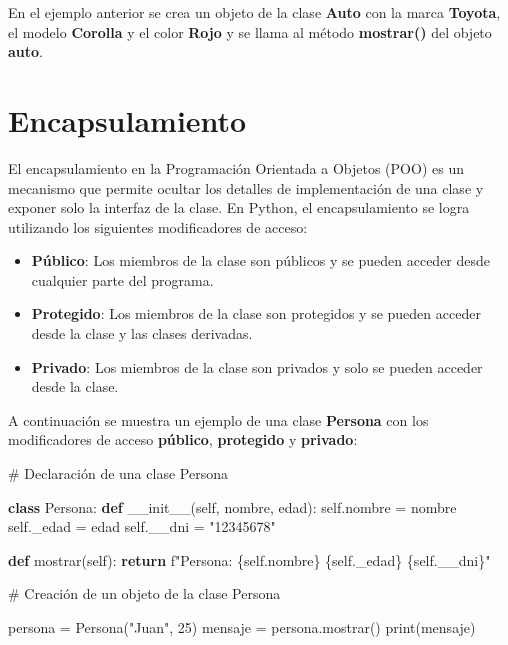 \documentclass[
  a4paper,
  DIV=11,
  numbers=noendperiod,
  onepage,
  openany]{scrreprt}
\newenvironment{Shaded}{\begin{snugshade}}{\end{snugshade}}
\newcommand{\BuiltInTok}[1]{\textcolor[rgb]{0.00,0.23,0.31}{#1}}
\newcommand{\CommentTok}[1]{\textcolor[rgb]{0.37,0.37,0.37}{#1}}
\newcommand{\ControlFlowTok}[1]{\textcolor[rgb]{0.00,0.23,0.31}{\textbf{#1}}}
\newcommand{\DecValTok}[1]{\textcolor[rgb]{0.68,0.00,0.00}{#1}}
\newcommand{\FunctionTok}[1]{\textcolor[rgb]{0.28,0.35,0.67}{#1}}
\newcommand{\KeywordTok}[1]{\textcolor[rgb]{0.00,0.23,0.31}{\textbf{#1}}}
\newcommand{\NormalTok}[1]{\textcolor[rgb]{0.00,0.23,0.31}{#1}}
\newcommand{\OperatorTok}[1]{\textcolor[rgb]{0.37,0.37,0.37}{#1}}
\newcommand{\SpecialCharTok}[1]{\textcolor[rgb]{0.37,0.37,0.37}{#1}}
\newcommand{\SpecialStringTok}[1]{\textcolor[rgb]{0.13,0.47,0.30}{#1}}
\newcommand{\StringTok}[1]{\textcolor[rgb]{0.13,0.47,0.30}{#1}}
\newcommand{\VariableTok}[1]{\textcolor[rgb]{0.07,0.07,0.07}{#1}}
\begin{document}
En el ejemplo anterior se crea un objeto de la clase \textbf{Auto} con
la marca \textbf{Toyota}, el modelo \textbf{Corolla} y el color
\textbf{Rojo} y se llama al método \textbf{mostrar()} del objeto
\textbf{auto}.

\section{Encapsulamiento}\label{encapsulamiento}

El encapsulamiento en la Programación Orientada a Objetos (POO) es un
mecanismo que permite ocultar los detalles de implementación de una
clase y exponer solo la interfaz de la clase. En Python, el
encapsulamiento se logra utilizando los siguientes modificadores de
acceso:

\begin{itemize}
\item
  \textbf{Público}: Los miembros de la clase son públicos y se pueden
  acceder desde cualquier parte del programa.
\item
  \textbf{Protegido}: Los miembros de la clase son protegidos y se
  pueden acceder desde la clase y las clases derivadas.
\item
  \textbf{Privado}: Los miembros de la clase son privados y solo se
  pueden acceder desde la clase.
\end{itemize}

A continuación se muestra un ejemplo de una clase \textbf{Persona} con
los modificadores de acceso \textbf{público}, \textbf{protegido} y
\textbf{privado}:

\begin{Shaded}
\begin{Highlighting}[]
\CommentTok{\# Declaración de una clase Persona}

\KeywordTok{class}\NormalTok{ Persona:}
    \KeywordTok{def} \FunctionTok{\_\_init\_\_}\NormalTok{(}\VariableTok{self}\NormalTok{, nombre, edad):}
        \VariableTok{self}\NormalTok{.nombre }\OperatorTok{=}\NormalTok{ nombre}
        \VariableTok{self}\NormalTok{.\_edad }\OperatorTok{=}\NormalTok{ edad}
        \VariableTok{self}\NormalTok{.\_\_dni }\OperatorTok{=} \StringTok{"12345678"}

    \KeywordTok{def}\NormalTok{ mostrar(}\VariableTok{self}\NormalTok{):}
        \ControlFlowTok{return} \SpecialStringTok{f"Persona: }\SpecialCharTok{\{}\VariableTok{self}\SpecialCharTok{.}\NormalTok{nombre}\SpecialCharTok{\}}\SpecialStringTok{ }\SpecialCharTok{\{}\VariableTok{self}\SpecialCharTok{.}\NormalTok{\_edad}\SpecialCharTok{\}}\SpecialStringTok{ }\SpecialCharTok{\{}\VariableTok{self}\SpecialCharTok{.}\NormalTok{\_\_dni}\SpecialCharTok{\}}\SpecialStringTok{"}

\CommentTok{\# Creación de un objeto de la clase Persona}

\NormalTok{persona }\OperatorTok{=}\NormalTok{ Persona(}\StringTok{"Juan"}\NormalTok{, }\DecValTok{25}\NormalTok{)}
\NormalTok{mensaje }\OperatorTok{=}\NormalTok{ persona.mostrar()}
\BuiltInTok{print}\NormalTok{(mensaje)}
\end{Highlighting}
\end{Shaded}
\end{document}
